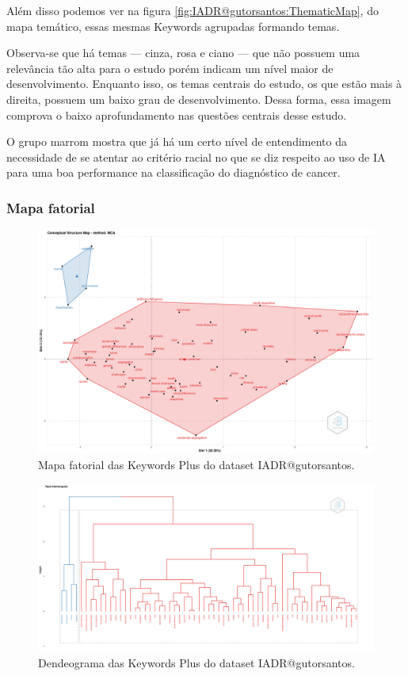 Além disso podemos ver na figura \ref{fig:IADR@gutorsantos:ThematicMap}, do mapa temático, essas mesmas Keywords agrupadas formando temas. 

Observa-se que há temas --- cinza, rosa e ciano --- que não possuem uma relevância tão alta para o estudo porém indicam um nível maior de desenvolvimento. Enquanto isso, os temas centrais do estudo, os que estão mais à direita, possuem um baixo grau de desenvolvimento. Dessa forma, essa imagem comprova o baixo aprofundamento nas questões centrais desse estudo.

O grupo marrom mostra que já há um certo nível de entendimento da necessidade de se atentar ao critério racial no que se diz respeito ao uso de IA para uma boa performance na classificação do diagnóstico de cancer. 

\subsubsection{Mapa fatorial}
\begin{figure}
    \centering
\includegraphics[angle=0,width=1\textwidth]{experiments/gutorsantos/AnaliseBibliometrica/IAeDiscriminacao/imgs/FactorialMap-2022-02-09.png}
    \caption{Mapa fatorial das Keywords Plus do dataset IADR@gutorsantos.}
    \label{fig:IADR@gutorsantos:FactorialMap}
\end{figure}

\begin{figure}
    \centering
\includegraphics[angle=0,width=1\textwidth]{experiments/gutorsantos/AnaliseBibliometrica/IAeDiscriminacao/imgs/Dendrogram-2022-02-09.png}
    \caption{Dendeograma das Keywords Plus do dataset IADR@gutorsantos.}
    \label{fig:IADR@gutorsantos:Dendeogram}
\end{figure}


